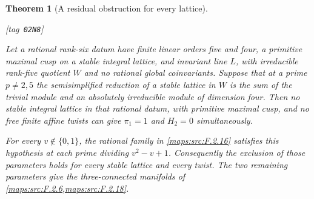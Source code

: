 \documentclass[11pt,a4paper]{article}
\numberwithin{equation}{section}
\newtheorem{theorem}{Theorem}[section]
\theoremstyle{definition}
\newcommand{\StatementRecord}[4]{{\upshape\footnotesize[tag~\texttt{#3}]}\enspace\ignorespaces}
\begin{document}
\begin{theorem}[A residual obstruction for every lattice]\hypertarget{tag-02N8}{}\label{maps:src:F.2.19}
\StatementRecord{maps:src:F.2.19}{proved}{02N8}{\cref{maps:src:F.2.16}, \eqref{maps:eq:F.U6}, \cref{maps:src:F.2.6}, \cref{maps:src:F.2.18}, \eqref{maps:eq:F.U12}, \cref{maps:src:F.2.17}, \eqref{maps:eq:F.U1}}


Let a rational rank-six datum have finite linear orders five
and four, a primitive maximal cusp on a stable integral lattice,
and invariant line $L$, with irreducible rank-five quotient $W$
and no rational global coinvariants.  Suppose that at a prime
$p\ne2,5$ the semisimplified reduction of a stable lattice in
$W$ is the sum of the trivial module and an absolutely
irreducible module of dimension four.  Then no stable integral
lattice in that rational datum, with primitive maximal cusp,
and no free finite affine twists can give
$\pi_1=1$ and $H_2=0$ simultaneously.

For every $v\notin\{0,1\}$, the rational family in \ref{maps:src:F.2.16}
satisfies this hypothesis at each prime dividing
$v^2-v+1$.  Consequently the exclusion of those parameters
holds for every stable lattice and every twist.  The two remaining parameters give the three-connected manifolds of \cref{maps:src:F.2.6,maps:src:F.2.18}.

\end{theorem}
\end{document}
